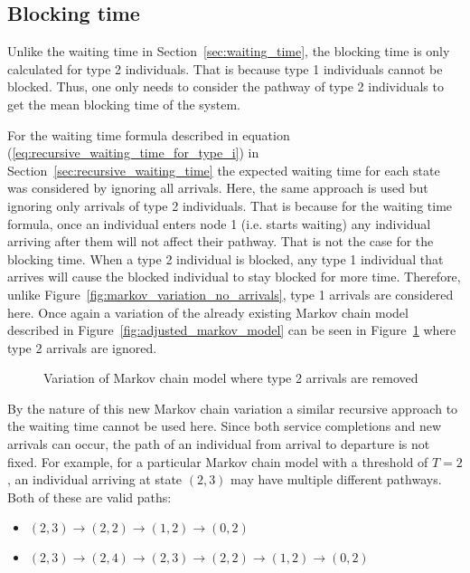 \subsection{Blocking time}\label{sec:blocking_time}

Unlike the waiting time in Section~\ref{sec:waiting_time}, 
the blocking time is only calculated for type 2 individuals.
That is because type 1 individuals cannot be blocked.
Thus, one only needs to consider the pathway of type 2 individuals to get the
mean blocking time of the system.

For the waiting time formula described in equation 
(\ref{eq:recursive_waiting_time_for_type_i}) in
Section~\ref{sec:recursive_waiting_time}
the expected waiting time for each state was considered by ignoring all
arrivals.
Here, the same approach is used but ignoring only arrivals of type 2
individuals.
That is because for the waiting time formula, once an individual enters
node 1 (i.e. starts waiting) any individual arriving after them will
not affect their pathway.
That is not the case for the blocking time.
When a type 2 individual is blocked, any type 1 individual that arrives will
cause the blocked individual to stay blocked for more time.
Therefore, unlike Figure~\ref{fig:markov_variation_no_arrivals}, type 1 arrivals
are considered here.
Once again a variation of the already existing Markov chain model described in
Figure~\ref{fig:adjusted_markov_model} can be seen in
Figure~\ref{fig:markov_variation_no_type_2_arrivals} where type 2 arrivals are
ignored.

\begin{figure}[ht]
    \centering
    
    \caption{Variation of Markov chain model where type 2 arrivals are removed}
    \label{fig:markov_variation_no_type_2_arrivals}
\end{figure}

By the nature of this new Markov chain variation a similar recursive approach
to the waiting time cannot be used here.
Since both service completions and new arrivals can occur, the path of an
individual from arrival to departure is not fixed.
For example, for a particular Markov chain model with a threshold of \(T=2\),
an individual arriving at state \((2, 3)\) may have multiple different pathways.
Both of these are valid paths:
\begin{itemize}
    \item \((2, 3) \rightarrow (2, 2) \rightarrow (1, 2) \rightarrow (0, 2)\)
    \item \((2, 3) \rightarrow (2, 4) \rightarrow (2, 3) \rightarrow (2, 2)
    \rightarrow (1, 2) \rightarrow (0, 2)\)
\end{itemize}

